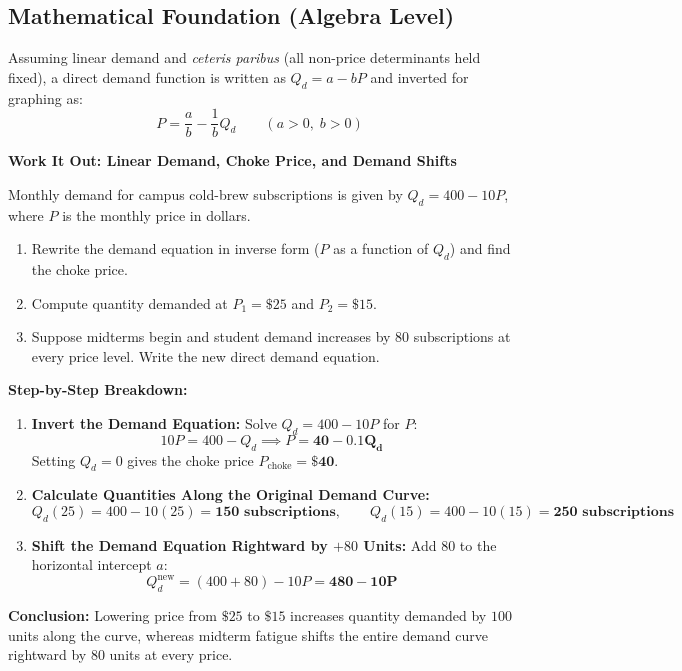 \documentclass[11pt,letterpaper]{article}
\begin{document}
\subsection*{Mathematical Foundation (Algebra Level)}
Assuming linear demand and \emph{ceteris paribus} (all non-price determinants held fixed), a direct demand function is written as $Q_d = a - bP$ and inverted for graphing as:
\begin{equation}
P = \frac{a}{b} - \frac{1}{b}Q_d \qquad (a > 0, \; b > 0)
\end{equation}

\noindent\textbf{Work It Out: Linear Demand, Choke Price, and Demand Shifts}

\noindent Monthly demand for campus cold-brew subscriptions is given by $Q_d = 400 - 10P$, where $P$ is the monthly price in dollars.
\begin{enumerate}
    \item Rewrite the demand equation in inverse form ($P$ as a function of $Q_d$) and find the choke price.
    \item Compute quantity demanded at $P_1 = \$25$ and $P_2 = \$15$.
    \item Suppose midterms begin and student demand increases by $80$ subscriptions at every price level. Write the new direct demand equation.
\end{enumerate}

\noindent\textbf{Step-by-Step Breakdown:}
\begin{enumerate}
    \item \textbf{Invert the Demand Equation:}
    Solve $Q_d = 400 - 10P$ for $P$:
    \[
    10P = 400 - Q_d \implies P = \mathbf{40 - 0.1Q_d}
    \]
    Setting $Q_d = 0$ gives the choke price $P_{\text{choke}} = \mathbf{\$40}$.

    \item \textbf{Calculate Quantities Along the Original Demand Curve:}
    \[
    Q_d(25) = 400 - 10(25) = \mathbf{150\text{ subscriptions}}, \qquad Q_d(15) = 400 - 10(15) = \mathbf{250\text{ subscriptions}}
    \]

    \item \textbf{Shift the Demand Equation Rightward by $+80$ Units:}
    Add $80$ to the horizontal intercept $a$:
    \[
    Q_d^{\text{new}} = (400 + 80) - 10P = \mathbf{480 - 10P}
    \]
\end{enumerate}
\textbf{Conclusion:} Lowering price from $\$25$ to $\$15$ increases quantity demanded by $100$ units along the curve, whereas midterm fatigue shifts the entire demand curve rightward by $80$ units at every price.
\end{document}
